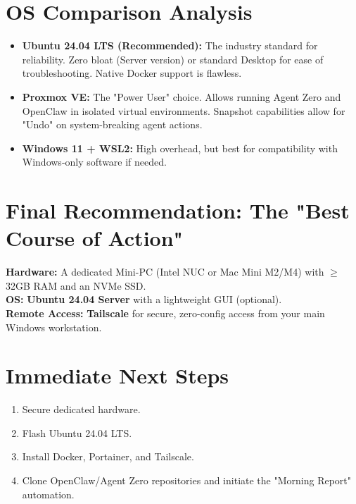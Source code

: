 \documentclass[11pt,a4paper]{article}
\begin{document}
\section{OS Comparison Analysis}

\begin{itemize}
    \item \textbf{Ubuntu 24.04 LTS (Recommended):} The industry standard for reliability. Zero bloat (Server version) or standard Desktop for ease of troubleshooting. Native Docker support is flawless.
    \item \textbf{Proxmox VE:} The "Power User" choice. Allows running Agent Zero and OpenClaw in isolated virtual environments. Snapshot capabilities allow for "Undo" on system-breaking agent actions.
    \item \textbf{Windows 11 + WSL2:} High overhead, but best for compatibility with Windows-only software if needed.
\end{itemize}

\section{Final Recommendation: The "Best Course of Action"}
\textbf{Hardware:} A dedicated Mini-PC (Intel NUC or Mac Mini M2/M4) with $\geq$32GB RAM and an NVMe SSD. \\
\textbf{OS:} \textcolor{secondary}{\textbf{Ubuntu 24.04 Server}} with a lightweight GUI (optional). \\
\textbf{Remote Access:} \textbf{Tailscale} for secure, zero-config access from your main Windows workstation.

\section{Immediate Next Steps}
\begin{enumerate}
    \item Secure dedicated hardware.
    \item Flash Ubuntu 24.04 LTS.
    \item Install Docker, Portainer, and Tailscale.
    \item Clone OpenClaw/Agent Zero repositories and initiate the "Morning Report" automation.
\end{enumerate}
\end{document}
